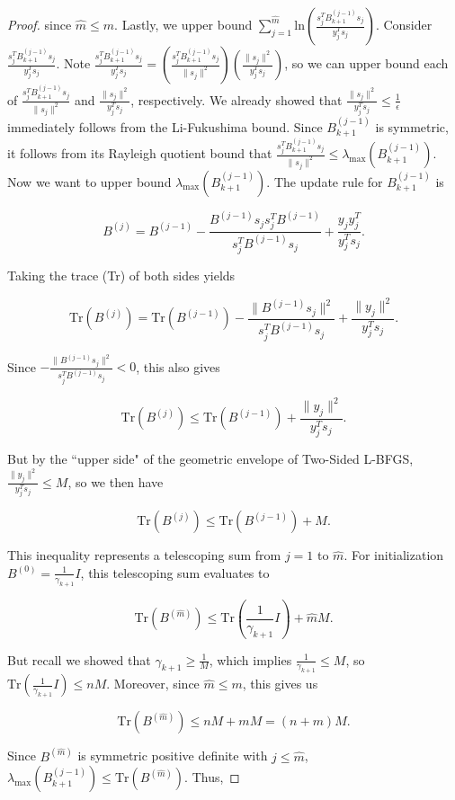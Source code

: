 \documentclass[twoside,11pt]{article}
\begin{document}
\begin{proof}
\noindent
since $\hat{m} \leq m$. Lastly, we upper bound $\sum_{j=1}^{\hat{m}}\text{ln}(\frac{s_j^T B_{k+1}^{(j-1)}s_j}{y_j^T s_j})$. Consider $\frac{s_j^T B_{k+1}^{(j-1)}s_j}{y_j^T s_j}$. Note $\frac{s_j^T B_{k+1}^{(j-1)}s_j}{y_j^T s_j} = (\frac{s_j^T B_{k+1}^{(j-1)}s_j}{\|s_j\|^2})(\frac{\|s_j\|^2}{y_j^T s_j})$, so we can upper bound each of $\frac{s_j^T B_{k+1}^{(j-1)}s_j}{\|s_j\|^2}$ and $\frac{\|s_j\|^2}{y_j^T s_j}$, respectively. We already showed that $\frac{\|s_j\|^2}{y_j^T s_j} \leq \frac{1}{\epsilon}$ immediately follows from the Li-Fukushima bound. Since $B_{k+1}^{(j-1)}$ is symmetric, it follows from its Rayleigh quotient bound that $\frac{s_j^T B_{k+1}^{(j-1)}s_j}{\|s_j\|^2} \leq \lambda_{\text{max}}(B_{k+1}^{(j-1)})$. Now we want to upper bound $\lambda_{\text{max}}(B_{k+1}^{(j-1)})$. The update rule for $B_{k+1}^{(j-1)}$ is

\[
B^{(j)} = B^{(j-1)} - \frac{B^{(j-1)}s_j s_j^T B^{(j-1)}}{s_j^T B^{(j-1)}s_j} + \frac{y_j y_j^T}{y_j^T s_j}.
\]

\noindent
Taking the trace (Tr) of both sides yields

\[
\text{Tr}(B^{(j)}) = \text{Tr}(B^{(j-1)}) - \frac{\|B^{(j-1)}s_j\|^2}{s_j^T B^{(j-1)}s_j} + \frac{\|y_j\|^2}{y_j^T s_j}.
\]

\noindent
Since $- \frac{\|B^{(j-1)}s_j\|^2}{s_j^T B^{(j-1)}s_j} < 0$, this also gives

\[
\text{Tr}(B^{(j)}) \leq \text{Tr}(B^{(j-1)}) + \frac{\|y_j\|^2}{y_j^T s_j}.
\]

\noindent
But by the ``upper side" of the geometric envelope of Two-Sided L-BFGS, $\frac{\|y_j\|^2}{y_j^T s_j} \leq M$, so we then have

\[
\text{Tr}(B^{(j)}) \leq \text{Tr}(B^{(j-1)}) + M.
\]

\noindent
This inequality represents a telescoping sum from $j = 1$ to $\hat{m}$. For initialization $B^{(0)} = \frac{1}{\gamma_{k+1}}I$, this telescoping sum evaluates to

\[
\text{Tr}(B^{(\hat{m})}) \leq \text{Tr}(\frac{1}{\gamma_{k+1}}I) + \hat{m}M.
\]

\noindent
But recall we showed that $\gamma_{k+1} \geq \frac{1}{M}$, which implies $\frac{1}{\gamma_{k+1}} \leq M$, so $\text{Tr}(\frac{1}{\gamma_{k+1}}I) \leq nM$. Moreover, since $\hat{m} \leq m$, this gives us

\[
\text{Tr}(B^{(\hat{m})}) \leq nM + mM = (n+m)M.
\]

\noindent
Since $B^{(\hat{m})}$ is symmetric positive definite with $j \leq \hat{m}$, $\lambda_{\text{max}}(B_{k+1}^{(j-1)}) \leq \text{Tr}(B^{(\hat{m})})$. Thus,


\end{proof}
\end{document}

